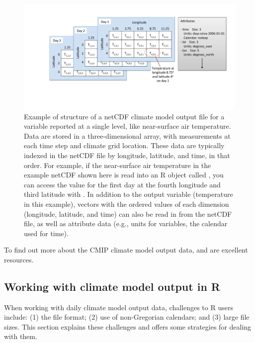 \begin{figure}
\begin{center}
\includegraphics[width = \textwidth]{netcdf_figure}
\end{center}
\caption{Example of structure of a netCDF climate model output file for a variable reported at a single level, like near-surface air temperature. Data are stored in a three-dimensional array, with measurements at each time step and climate grid location. These data are typically indexed in the netCDF file by longitude, latitude, and time, in that order. For example, if the near-surface air temperature in the example netCDF shown here is read into an R object called , you can access the value for the first day at the fourth longitude and third latitude with . In addition to the output variable (temperature in this example), vectors with the ordered values of each dimension (longitude, latitude, and time) can also be read in from the netCDF file, as well as attribute data (e.g., units for variables, the calendar used for time).}
\label{fig:netcdfexample}
\end{figure}

To find out more about the CMIP climate model output data,
\citet{taylor2012overview} and \citet{meehl2007wcrp} are excellent
resources.

\subsection{Working with climate model output in
R}\label{working-with-climate-model-output-in-r}

When working with daily climate model output data, challenges to R users
include: (1) the file format; (2) use of non-Gregorian calendars; and
(3) large file sizes. This section explains these challenges and offers
some strategies for dealing with them.


